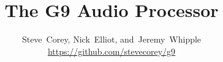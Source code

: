 \documentclass[journal]{IEEEtran}
\begin{document}
	\title{The G9 Audio Processor}
	
	\author{Steve~Corey,
		Nick~Elliot,
		and~Jeremy~Whipple%
		\\
		\url{https://github.com/stevecorey/g9}
		
	}
	
	
	
\end{document}
